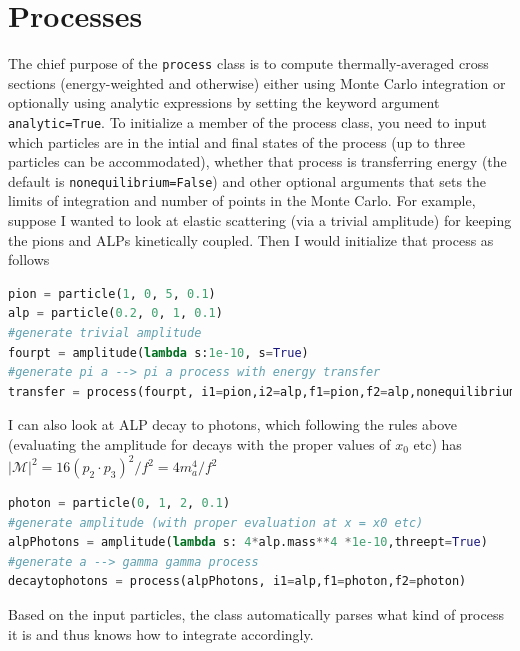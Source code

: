 \documentclass[superscriptaddress,nofootinbib,notitlepage,onecolumn]{revtex4-1}
\newcommand{\abs}[1]{\left| #1 \right|}
\newcommand{\code}[1]{\texttt{#1}}
\begin{document}
\section{Processes}
\label{process_sec}
The chief purpose of the \code{process} class is to compute thermally-averaged cross sections (energy-weighted and otherwise)
either using Monte Carlo integration or optionally using analytic expressions by setting the keyword argument \code{analytic=True}. To initialize a member of the process class, you need to input which particles are in the intial and final states of the process (up to three particles can be accommodated), whether that process is transferring energy (the default is \code{nonequilibrium=False}) and other optional arguments that sets the limits of integration and number of points in the Monte Carlo. For example, suppose I wanted to look at elastic scattering (via a trivial amplitude) for keeping the pions and ALPs kinetically coupled. Then I would initialize that process as follows 
\begin{lstlisting}[language=Python]
pion = particle(1, 0, 5, 0.1)
alp = particle(0.2, 0, 1, 0.1)
#generate trivial amplitude
fourpt = amplitude(lambda s:1e-10, s=True)
#generate pi a --> pi a process with energy transfer
transfer = process(fourpt, i1=pion,i2=alp,f1=pion,f2=alp,nonequilibrium=True)
\end{lstlisting}
I can also look at ALP decay to photons, which following the rules above (evaluating the amplitude for decays with the proper values of $x_0$ etc) has $\abs{\mathcal{M}}^2 = 16 (p_2\cdot p_3)^2 / f^2 = 4 m_a^4/f^2$
\begin{lstlisting}[language=Python]
photon = particle(0, 1, 2, 0.1)
#generate amplitude (with proper evaluation at x = x0 etc)
alpPhotons = amplitude(lambda s: 4*alp.mass**4 *1e-10,threept=True)
#generate a --> gamma gamma process
decaytophotons = process(alpPhotons, i1=alp,f1=photon,f2=photon)
\end{lstlisting}
Based on the input particles, the class automatically parses what kind of process it is and thus knows how to integrate accordingly.
\end{document}
